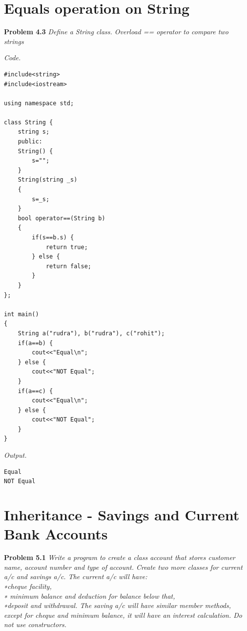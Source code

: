 \documentclass[12pt]{article}
\begin{document}
\section{Equals operation on String}

\textbf{Problem 4.3} \textit{Define a String class. Overload == operator to compare two strings}

\textit{Code.}
\begin{lstlisting}
#include<string>
#include<iostream>

using namespace std;

class String {
	string s;
	public:
	String() {
		s="";
	}
	String(string _s)
	{
		s=_s;
	}
	bool operator==(String b)
	{
		if(s==b.s) {
			return true;
		} else {
			return false;
		}
	}
};

int main()
{
	String a("rudra"), b("rudra"), c("rohit");
	if(a==b) {
		cout<<"Equal\n";
	} else {
		cout<<"NOT Equal";
	}
	if(a==c) {
		cout<<"Equal\n";
	} else {
		cout<<"NOT Equal";
	}
}
\end{lstlisting}

\textit{Output.}
\begin{lstlisting}
Equal
NOT Equal
\end{lstlisting}


\section{Inheritance - Savings and Current Bank Accounts}

\textbf{Problem 5.1} \textit{Write a program to create a class account that stores customer
name, account number and type of account. Create two more classes
for current a/c and savings a/c. The current a/c will have:\\
∗cheque facility,\\
∗ minimum balance and deduction for balance below that,\\
∗deposit and withdrawal. The saving a/c will have similar member
methods, except for cheque and minimum balance, it will have an
interest calculation. Do not use constructors.}
\end{document}
